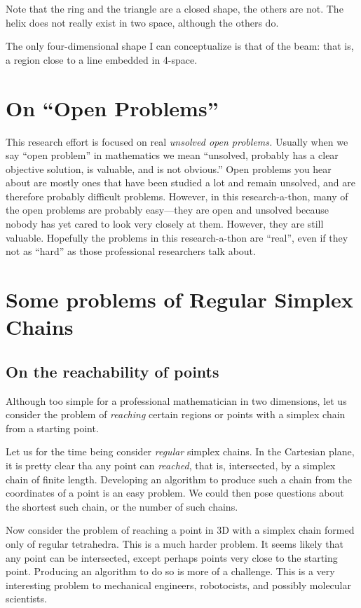 \documentclass[11pt]{article}
\begin{document}
Note that the ring and the triangle are a closed shape, the others are not.
The helix does not really exist in two space, although the others do.

The only four-dimensional shape I can conceptualize is that of the
beam: that is, a region close to a line embedded in 4-space.

\section{On ``Open Problems''}

This research effort is focused on real {\em unsolved open problems.}
Usually when we say ``open problem'' in mathematics we mean ``unsolved, probably has a clear objective solution, is valuable,
and is not obvious.''
Open problems you hear about are mostly ones that have been studied a lot and remain unsolved, and are therefore probably difficult problems.
However, in this research-a-thon, many of the open problems are probably easy---they are open and unsolved because nobody has yet
cared to look very closely at them.  However, they are still valuable. Hopefully the problems in this research-a-thon are ``real'', even if they
not as ``hard'' as those professional researchers talk about.

\section{Some problems of Regular Simplex Chains}

\subsection{On the reachability of points}

Although too simple for a professional mathematician in two dimensions, let us consider the problem of {\em reaching} certain regions
or points with a simplex chain from a starting point.

Let us for the time being consider {\em regular} simplex chains.  In the Cartesian plane, it is pretty clear tha any point can {\em reached},
that is, intersected, by a simplex chain of finite length. Developing an algorithm to produce such a chain from the coordinates of a point
is an easy problem. We could then pose questions about the shortest such chain, or the number of such chains.

Now consider the problem of reaching a point in 3D with a simplex chain formed only of regular tetrahedra. This is a much harder problem.
It seems likely that any point can be intersected, except perhaps points very close to the starting point. Producing an algorithm to do so
is more of a challenge. This is a very interesting problem to mechanical engineers, robotocists, and possibly molecular scientists.
\end{document}
